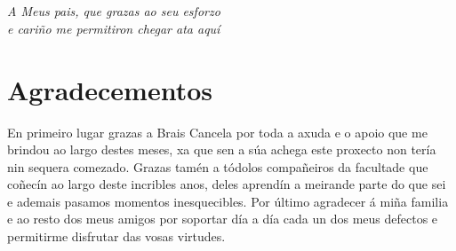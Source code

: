
\chapter*{}

\begin{flushright}
\emph{A Meus pais, que grazas ao seu esforzo \\e cariño me permitiron chegar ata aquí}
\end{flushright}


\chapter*{Agradecementos}

En primeiro lugar grazas a Brais Cancela por toda a axuda e o apoio que me brindou 
ao largo destes meses, xa que sen a súa achega este proxecto non tería nin sequera comezado.
Grazas tamén a tódolos compañeiros da facultade que coñecín ao largo deste incribles anos,
deles aprendín a meirande parte do que sei e ademais pasamos momentos inesquecibles. Por
último agradecer á miña familia e ao resto dos meus amigos por soportar día a día cada 
un dos meus defectos e permitirme disfrutar das vosas virtudes.
